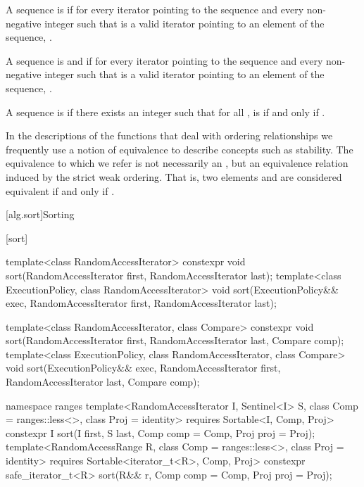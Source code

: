 \pnum
A sequence is
 if for every iterator
pointing to the sequence and every non-negative integer
such that
is a valid iterator pointing to an element of the sequence,
.

\begin{addedblock}
\pnum
A sequence is
 and  if for every iterator
pointing to the sequence and every non-negative integer
such that
is a valid iterator pointing to an element of the sequence,
.
\end{addedblock}

\pnum
A sequence
is
if there exists an integer
such that for all
,
is  if and only if
.

\pnum
In the descriptions of the functions that deal with ordering relationships we frequently use a notion of
equivalence to describe concepts such as stability.
The equivalence to which we refer is not necessarily an
,
but an equivalence relation induced by the strict weak ordering.
That is, two elements
and
are considered equivalent if and only if
.

[alg.sort]{Sorting}

[sort]{}

%
\begin{itemdecl}
template<class RandomAccessIterator>
  constexpr void sort(RandomAccessIterator first, RandomAccessIterator last);
template<class ExecutionPolicy, class RandomAccessIterator>
  void sort(ExecutionPolicy&& exec,
            RandomAccessIterator first, RandomAccessIterator last);

template<class RandomAccessIterator, class Compare>
  constexpr void sort(RandomAccessIterator first, RandomAccessIterator last,
            Compare comp);
template<class ExecutionPolicy, class RandomAccessIterator, class Compare>
  void sort(ExecutionPolicy&& exec,
            RandomAccessIterator first, RandomAccessIterator last,
            Compare comp);
\end{itemdecl}
\begin{addedblock}
\begin{itemdecl}
namespace ranges {
  template<RandomAccessIterator I, Sentinel<I> S, class Comp = ranges::less<>,
      class Proj = identity>
    requires Sortable<I, Comp, Proj>
    constexpr I
      sort(I first, S last, Comp comp = Comp{}, Proj proj = Proj{});
  template<RandomAccessRange R, class Comp = ranges::less<>, class Proj = identity>
    requires Sortable<iterator_t<R>, Comp, Proj>
    constexpr safe_iterator_t<R>
      sort(R&& r, Comp comp = Comp{}, Proj proj = Proj{});
}
\end{itemdecl}
\end{addedblock}

